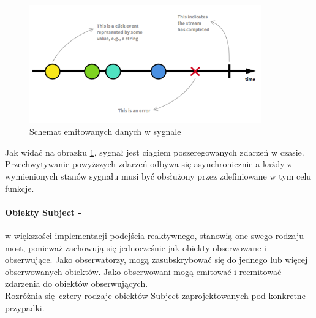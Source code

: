 \documentclass[12pt,oneside,a4paper]{report}
\begin{document}
\begin{figure}[ht!]
\centering
\includegraphics[width=10cm]{sygnalRx}
\caption{Schemat emitowanych danych w sygnale \cite{introToRx}}
\label{sygnalRx}
\end{figure}

Jak widać na obrazku \ref{sygnalRx}, sygnał jest ciągiem poszeregowanych zdarzeń w czasie. Przechwytywanie powyższych zdarzeń odbywa się asynchronicznie a każdy z wymienionych stanów sygnału musi być obsłużony przez zdefiniowane w tym celu funkcje. \\


\paragraph{Obiekty Subject -}w większości implementacji podejścia reaktywnego, stanowią one swego rodzaju most, ponieważ zachowują się jednocześnie jak obiekty obserwowane i obserwujące. Jako obserwatorzy, mogą zasubskrybować się do jednego lub więcej obserwowanych obiektów. Jako obserwowani mogą emitować i reemitować zdarzenia do obiektów obserwujących.\\
Rozróżnia się cztery rodzaje obiektów Subject zaprojektowanych pod konkretne przypadki.  
\end{document}
